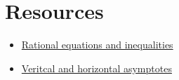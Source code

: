 \documentclass{article}
\begin{document}
\section*{Resources}
\begin{itemize}
    \item \href{https://ximera.osu.edu/calcwithreview/calculusWithReview/rationalFunctions/digInRationalEqIneq}{Rational equations and inequalities}
    \item \href{https://www.andrews.edu/~rwright/Precalculus-RLW/Text/02-07.html#:~:text=A%20vertical%20asymptote%20of%20a,inputs%20approach%20%E2%88%9E%20or%20%E2%80%93%E2%88%9E.}{Veritcal and horizontal asymptotes }
\end{itemize}
\end{document}
